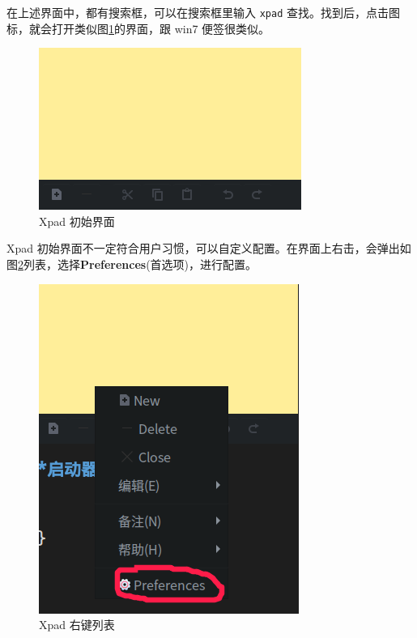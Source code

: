 \documentclass[doctor,openright,twoside]{sjtuthesis}
\newcommand{\passthrough}[1]{#1}
\theoremstyle{plain}
\theoremstyle{definition}
\theoremstyle{remark}
\theoremstyle{ocrenumbox}
\theoremstyle{plain}
\begin{document}
在上述界面中，都有搜索框，可以在搜索框里输入
\passthrough{\lstinline!xpad!}
查找。找到后，点击图标，就会打开类似图\ref{fig:xpad-start}的界面，跟
win7 便签很类似。

\begin{figure}

{\centering \includegraphics[width=0.618\linewidth]{images/education-xpad-start} 

}

\caption[Xpad 初始界面]{Xpad 初始界面}\label{fig:xpad-start}
\end{figure}

Xpad
初始界面不一定符合用户习惯，可以自定义配置。在界面上右击，会弹出如图\ref{fig:xpad-rightclick}列表，选择\textbf{Preferences}(首选项)，进行配置。

\begin{figure}

{\centering \includegraphics[width=0.618\linewidth]{images/education-xpad-rightclick} 

}

\caption[Xpad 右键列表]{Xpad 右键列表}\label{fig:xpad-rightclick}
\end{figure}
\end{document}
